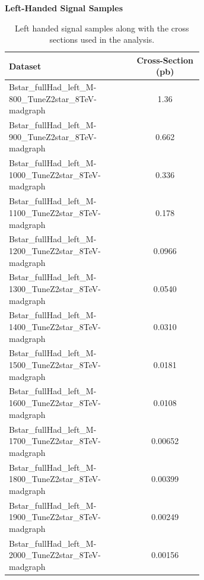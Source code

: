 \begin{table}
\begin{center}
\bf{Left-Handed Signal Samples}
\begin{tabular}{|p{0.65\linewidth}|c|}
\hline
\bf{Dataset} &  \bf{Cross-Section (pb)} \\
\hline
Bstar\_fullHad\_left\_M-800\_TuneZ2star\_8TeV-madgraph & 1.36 \\
\hline
Bstar\_fullHad\_left\_M-900\_TuneZ2star\_8TeV-madgraph & 0.662 \\
\hline
Bstar\_fullHad\_left\_M-1000\_TuneZ2star\_8TeV-madgraph & 0.336 \\ 
\hline
Bstar\_fullHad\_left\_M-1100\_TuneZ2star\_8TeV-madgraph & 0.178 \\ 
\hline
Bstar\_fullHad\_left\_M-1200\_TuneZ2star\_8TeV-madgraph & 0.0966 \\
\hline
Bstar\_fullHad\_left\_M-1300\_TuneZ2star\_8TeV-madgraph & 0.0540 \\
\hline
Bstar\_fullHad\_left\_M-1400\_TuneZ2star\_8TeV-madgraph & 0.0310 \\
\hline
Bstar\_fullHad\_left\_M-1500\_TuneZ2star\_8TeV-madgraph & 0.0181 \\
\hline
Bstar\_fullHad\_left\_M-1600\_TuneZ2star\_8TeV-madgraph & 0.0108 \\
\hline
Bstar\_fullHad\_left\_M-1700\_TuneZ2star\_8TeV-madgraph & 0.00652 \\
\hline
Bstar\_fullHad\_left\_M-1800\_TuneZ2star\_8TeV-madgraph & 0.00399 \\
\hline
Bstar\_fullHad\_left\_M-1900\_TuneZ2star\_8TeV-madgraph & 0.00249 \\
\hline
Bstar\_fullHad\_left\_M-2000\_TuneZ2star\_8TeV-madgraph & 0.00156 \\
\hline

\end{tabular}
\end{center}
\caption{Left handed signal samples along with the cross sections used in the analysis.}
\label{table:bssignalsetsleft}
\end{table}


